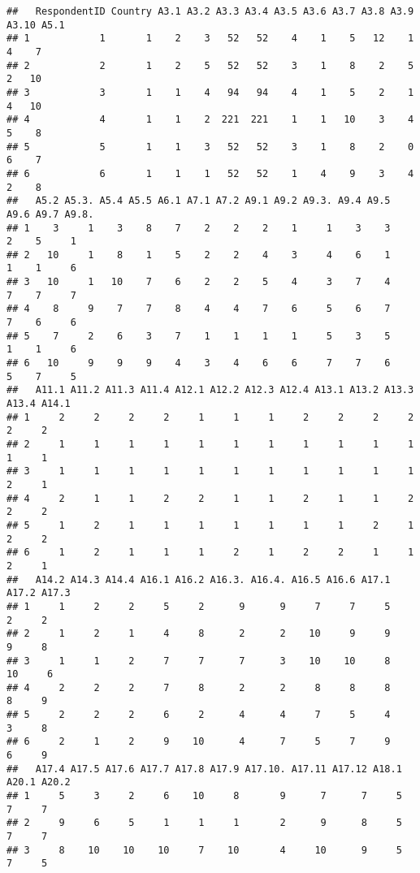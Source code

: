 \documentclass[
]{article}
\begin{document}
\begin{verbatim}
##   RespondentID Country A3.1 A3.2 A3.3 A3.4 A3.5 A3.6 A3.7 A3.8 A3.9 A3.10 A5.1
## 1            1       1    2    3   52   52    4    1    5   12    1     4    7
## 2            2       1    2    5   52   52    3    1    8    2    5     2   10
## 3            3       1    1    4   94   94    4    1    5    2    1     4   10
## 4            4       1    1    2  221  221    1    1   10    3    4     5    8
## 5            5       1    1    3   52   52    3    1    8    2    0     6    7
## 6            6       1    1    1   52   52    1    4    9    3    4     2    8
##   A5.2 A5.3. A5.4 A5.5 A6.1 A7.1 A7.2 A9.1 A9.2 A9.3. A9.4 A9.5 A9.6 A9.7 A9.8.
## 1    3     1    3    8    7    2    2    2    1     1    3    3    2    5     1
## 2   10     1    8    1    5    2    2    4    3     4    6    1    1    1     6
## 3   10     1   10    7    6    2    2    5    4     3    7    4    7    7     7
## 4    8     9    7    7    8    4    4    7    6     5    6    7    7    6     6
## 5    7     2    6    3    7    1    1    1    1     5    3    5    1    1     6
## 6   10     9    9    9    4    3    4    6    6     7    7    6    5    7     5
##   A11.1 A11.2 A11.3 A11.4 A12.1 A12.2 A12.3 A12.4 A13.1 A13.2 A13.3 A13.4 A14.1
## 1     2     2     2     2     1     1     1     2     2     2     2     2     2
## 2     1     1     1     1     1     1     1     1     1     1     1     1     1
## 3     1     1     1     1     1     1     1     1     1     1     1     2     1
## 4     2     1     1     2     2     1     1     2     1     1     2     2     2
## 5     1     2     1     1     1     1     1     1     1     2     1     2     2
## 6     1     2     1     1     1     2     1     2     2     1     1     2     1
##   A14.2 A14.3 A14.4 A16.1 A16.2 A16.3. A16.4. A16.5 A16.6 A17.1 A17.2 A17.3
## 1     1     2     2     5     2      9      9     7     7     5     2     2
## 2     1     2     1     4     8      2      2    10     9     9     9     8
## 3     1     1     2     7     7      7      3    10    10     8    10     6
## 4     2     2     2     7     8      2      2     8     8     8     8     9
## 5     2     2     2     6     2      4      4     7     5     4     3     8
## 6     2     1     2     9    10      4      7     5     7     9     6     9
##   A17.4 A17.5 A17.6 A17.7 A17.8 A17.9 A17.10. A17.11 A17.12 A18.1 A20.1 A20.2
## 1     5     3     2     6    10     8       9      7      7     5     7     7
## 2     9     6     5     1     1     1       2      9      8     5     7     7
## 3     8    10    10    10     7    10       4     10      9     5     7     5

\end{verbatim}
\end{document}
